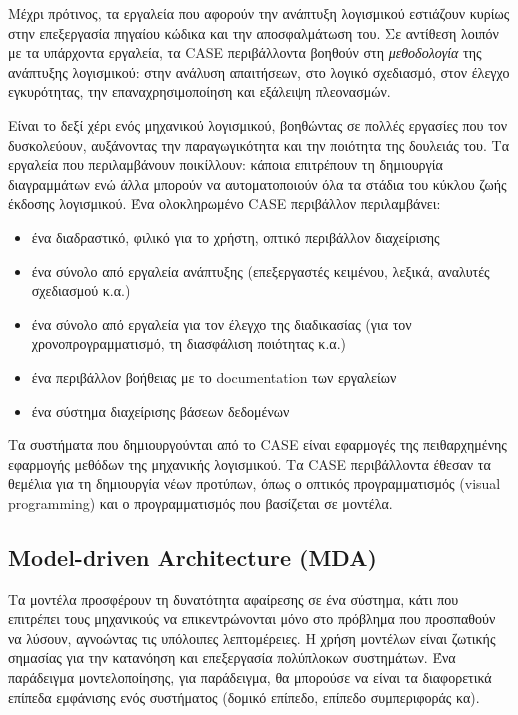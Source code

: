             Μέχρι πρότινος, τα εργαλεία που αφορούν την ανάπτυξη λογισμικού εστιάζουν κυρίως στην επεξεργασία πηγαίου κώδικα και την αποσφαλμάτωση του. Σε αντίθεση λοιπόν με τα υπάρχοντα εργαλεία, τα CASE περιβάλλοντα βοηθούν στη \textit{μεθοδολογία} της ανάπτυξης λογισμικού: στην ανάλυση απαιτήσεων, στο λογικό σχεδιασμό, στον έλεγχο εγκυρότητας, την επαναχρησιμοποίηση και εξάλειψη πλεονασμών.

            Είναι το δεξί χέρι ενός μηχανικού λογισμικού, βοηθώντας σε πολλές εργασίες που τον δυσκολεύουν, αυξάνοντας την παραγωγικότητα και την ποιότητα της δουλειάς του. Τα εργαλεία που περιλαμβάνουν ποικίλλουν: κάποια επιτρέπουν τη δημιουργία διαγραμμάτων ενώ άλλα μπορούν να αυτοματοποιούν όλα τα στάδια του κύκλου ζωής έκδοσης λογισμικού. Ένα ολοκληρωμένο CASE περιβάλλον περιλαμβάνει:
            \vspace{-0.5em}
            \begin{itemize}[label={\tiny \blacksquare}]
                \setlength\itemsep{-0.25em}
                \item ένα διαδραστικό, φιλικό για το χρήστη, οπτικό περιβάλλον διαχείρισης
                \item ένα σύνολο από εργαλεία ανάπτυξης (επεξεργαστές κειμένου, λεξικά, αναλυτές σχεδιασμού κ.α.)
                \item ένα σύνολο από εργαλεία για τον έλεγχο της διαδικασίας (για τον χρονοπρογραμματισμό, τη διασφάλιση ποιότητας κ.α.)
                \item ένα περιβάλλον βοήθειας με το documentation των εργαλείων
                \item ένα σύστημα διαχείρισης βάσεων δεδομένων
            \end{itemize}
            \vspace{-0.5em}

            Τα συστήματα που δημιουργούνται από το CASE είναι εφαρμογές της πειθαρχημένης εφαρμογής μεθόδων της μηχανικής λογισμικού.
            Τα CASE περιβάλλοντα έθεσαν τα θεμέλια για τη δημιουργία νέων προτύπων, όπως ο οπτικός προγραμματισμός (visual programming) και ο προγραμματισμός που βασίζεται σε μοντέλα. \cite{CASEChikofsky, Case1985, CASEKuhn, AdoptionCASE}

        \subsection{Model-driven Architecture (MDA)}
            Τα μοντέλα προσφέρουν τη δυνατότητα αφαίρεσης σε ένα σύστημα, κάτι που επιτρέπει τους μηχανικούς να επικεντρώνονται μόνο στο πρόβλημα που προσπαθούν να λύσουν, αγνοώντας τις υπόλοιπες λεπτομέρειες. Η χρήση μοντέλων είναι ζωτικής σημασίας για την κατανόηση και επεξεργασία πολύπλοκων συστημάτων. Ένα παράδειγμα μοντελοποίησης, για παράδειγμα, θα μπορούσε να είναι τα διαφορετικά επίπεδα εμφάνισης ενός συστήματος (δομικό επίπεδο, επίπεδο συμπεριφοράς κα).

